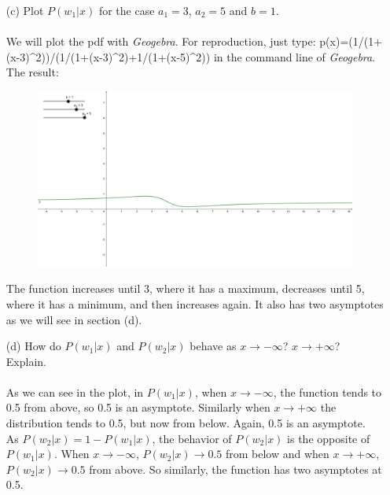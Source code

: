\documentclass[10pt]{article}
\begin{document}
\begin{enumerate}
\Large
  \item[(c)] Plot $P(w_1|x)$ for the case $a_1=3$, $a_2=5$ and $b=1$.\\ \ \\
\normalsize
We will plot the pdf with \textit{Geogebra}. For reproduction, just type: p(x)=(1/(1+(x-3)\^{}2))/(1/(1+(x-3)\^{}2)+1/(1+(x-5)\^{}2)) in the command line of \textit{Geogebra}. The result:
\begin{figure}[H]
\centering
\includegraphics[scale=0.4]{7c}
\end{figure}
The function increases until 3, where it has a maximum, decreases until 5, where it has a minimum, and then increases again. It also has two asymptotes as we will see in section (d). \\
\Large
  \item[(d)] How do $P(w_1|x)$ and $P(w_2|x)$ behave as $x \rightarrow -\infty$? $x \rightarrow +\infty$? Explain.\\ \ \\
\normalsize
As we can see in the plot, in $P(w_1|x)$, when $x \rightarrow -\infty$, the function tends to 0.5 from above, so 0.5 is an asymptote. Similarly when $x \rightarrow +\infty$ the distribution tends to 0.5, but now from below. Again, 0.5 is an asymptote. \\

As $P(w_2|x)=1-P(w_1|x)$, the behavior of $P(w_2|x)$ is the opposite of $P(w_1|x)$. When $x \rightarrow -\infty$, $P(w_2|x)\rightarrow 0.5$ from below and when $x \rightarrow +\infty$, $P(w_2|x)\rightarrow 0.5$ from above. So similarly, the function has two asymptotes at 0.5. \\


\end{enumerate}
\end{document}

